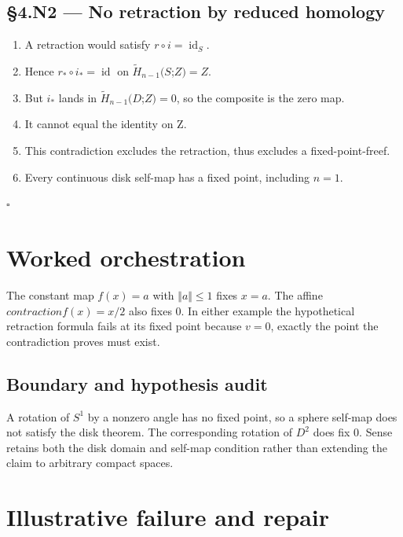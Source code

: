 \documentclass[preprint,12pt,aps,pra,showkeys,amsmath,amssymb,superscriptaddress,floatfix]{revtex4-2}
\theoremstyle{definition}
\theoremstyle{remark}
\begin{document}
\subsection{§4.N2 --- No retraction by reduced
homology}\label{n2-no-retraction-by-reduced-homology}

\begin{enumerate}
\def\labelenumi{\arabic{enumi}.}
\item
  A retraction would satisfy \(r\circ i=\operatorname{id} _S\).
\item
  Hence \(r_*\circ i_*=\operatorname{id}\) on
  \(\widetilde H_{n-1}(S\);\(Z)=Z\).
\item
  But \(i_*\) lands in \(\widetilde H_{n-1}(D\);\(Z)=0\), so the
  composite is the zero map.
\item
  It cannot equal the identity on Z.
\item
  This contradiction excludes the retraction, thus excludes a
  fixed-point-freef.
\item
  Every continuous disk self-map has a fixed point, including \(n=1\).
\end{enumerate}

\hfill$\square$

\section{Worked orchestration}

The constant map \(f(x)=a\) with \(\Vert a\Vert \le 1\) fixes \(x=a\).
The affine \(contractionf(x)=x/2\) also fixes 0. In either example the
hypothetical retraction formula fails at its fixed point because
\(v=0\), exactly the point the contradiction proves must exist.

\subsection{Boundary and hypothesis audit}

A rotation of \(S^{1}\) by a nonzero angle has no fixed point, so a
sphere self-map does not satisfy the disk theorem. The corresponding
rotation of \(D^{2}\) does fix 0. Sense retains both the disk domain and
self-map condition rather than extending the claim to arbitrary compact
spaces.

\section{Illustrative failure and repair}
\end{document}
